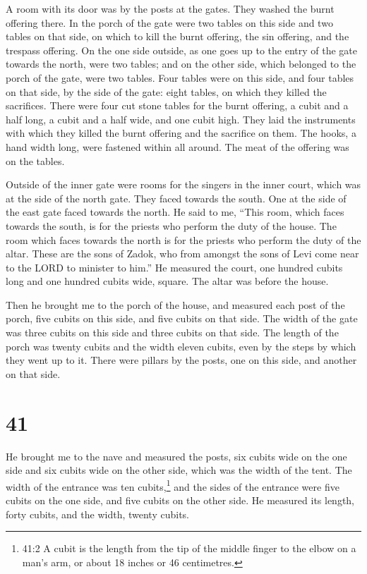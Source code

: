  A room with its door was by the posts at the gates. They
washed the burnt offering there.  In the porch of the gate
were two tables on this side and two tables on that side, on which to
kill the burnt offering, the sin offering, and the trespass offering.
 On the one side outside, as one goes up to the entry of
the gate towards the north, were two tables; and on the other side,
which belonged to the porch of the gate, were two tables. 
Four tables were on this side, and four tables on that side, by the side
of the gate: eight tables, on which they killed the sacrifices.
 There were four cut stone tables for the burnt offering, a
cubit and a half long, a cubit and a half wide, and one cubit high. They
laid the instruments with which they killed the burnt offering and the
sacrifice on them.  The hooks, a hand width long, were
fastened within all around. The meat of the offering was on the tables.

 Outside of the inner gate were rooms for the singers in
the inner court, which was at the side of the north gate. They faced
towards the south. One at the side of the east gate faced towards the
north.  He said to me, ``This room, which faces towards the
south, is for the priests who perform the duty of the house.
 The room which faces towards the north is for the priests
who perform the duty of the altar. These are the sons of Zadok, who from
amongst the sons of Levi come near to the LORD to minister to him.''
 He measured the court, one hundred cubits long and one
hundred cubits wide, square. The altar was before the house.

 Then he brought me to the porch of the house, and measured
each post of the porch, five cubits on this side, and five cubits on
that side. The width of the gate was three cubits on this side and three
cubits on that side.  The length of the porch was twenty
cubits and the width eleven cubits, even by the steps by which they went
up to it. There were pillars by the posts, one on this side, and another
on that side.

\hypertarget{section-39}{%
\section{41}\label{section-39}}

 He brought me to the nave and measured the posts, six
cubits wide on the one side and six cubits wide on the other side, which
was the width of the tent.  The width of the entrance was
ten cubits,\footnote{41:2 A cubit is the length from the tip of the
  middle finger to the elbow on a man's arm, or about 18 inches or 46
  centimetres.} and the sides of the entrance were five cubits on the
one side, and five cubits on the other side. He measured its length,
forty cubits, and the width, twenty cubits.

